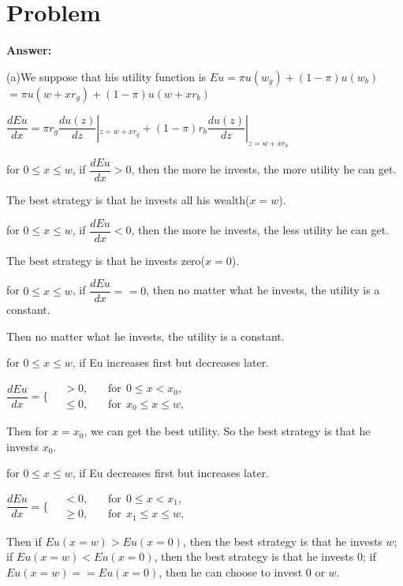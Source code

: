 \documentclass[a4 paper,12pt]{article}
\begin{document}
\section{Problem}
\noindent
\textbf{Answer:}
\par (a)We suppose that his utility function is $Eu=\pi u(w_{g})+(1-\pi )u(w_{b})$\\$=\pi u(w+xr_{g})+(1-\pi)u(w+xr_{b})$
\par $\dfrac{dEu}{dx}=\pi r_{g}\dfrac{du(z)}{dz}|_{z=w+xr_{g}}+(1-\pi)r_{b}\dfrac{du(z)}{dz}|_{z=w+xr_{b}}$
\par {} for $0\le x\le w$, if $\dfrac{dEu}{dx}>0$, then the more he invests, the more utility he can get.
\par The best strategy is that he invests all his wealth($x=w$).
\par {} for $0\le x\le w$, if $\dfrac{dEu}{dx}<0$, then the more he invests, the less utility he can get.
\par The best strategy is that he invests zero($x=0$). 
\par {} for $0\le x\le w$, if $\dfrac{dEu}{dx}==0$, then no matter what he invests, the utility is a constant.
\par Then no matter what he invests, the utility is a constant. 
\par {}for $0\le x\le w$, if Eu increases first but decreases later.
\par $\dfrac{dEu}{dx}=
		\bigg\lbrace
		\begin{aligned}\,
			& >0, \,
			&&\text{for}\ \ 0\le x<x_{0}, \\[-.5ex]
			& \le 0, 
			&&\text{for}\ \ x_{0}\le x\le w,
		\end{aligned}$
\par Then for $x=x_{0}$, we can get the best utility. So the best strategy is that he invests $x_{0}$.
\par {}for $0\le x\le w$, if Eu decreases first but increases later.
\par $\dfrac{dEu}{dx}=
		\bigg\lbrace
		\begin{aligned}\,
			& <0, \,
			&&\text{for}\ \ 0\le x<x_{1}, \\[-.5ex]
			& \ge 0, 
			&&\text{for}\ \ x_{1}\le x\le w,
		\end{aligned}$
\par Then if $Eu(x=w)>Eu(x=0)$, then the best strategy is that he invests $w$; if $Eu(x=w)<Eu(x=0)$, then the best strategy is that he invests $0$; if $Eu(x=w)==Eu(x=0)$, then he can choose to invest 0 or $w$.
\end{document}
